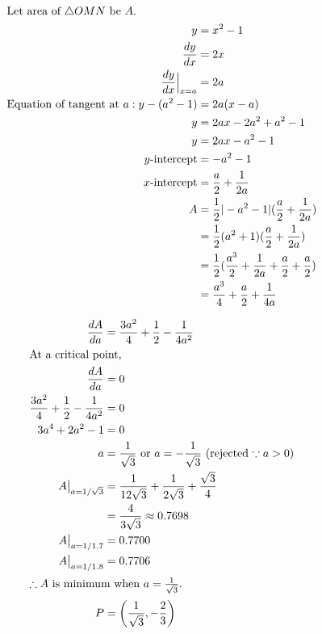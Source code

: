 \documentclass[12pt]{article}
\newenvironment{problem}[2][Problem]{\begin{trivlist}
\item[\hskip \labelsep {\bfseries #1}\hskip \labelsep {\bfseries #2.}]}{\end{trivlist}}
\begin{document}
\begin{problem}{5.i}
\end{problem}
\begin{align*}
\shortintertext{Let area of $\triangle OMN$ be $A$.}
y &= x^2 - 1\\
\frac{dy}{dx} &= 2x\\
\frac{dy}{dx}\Bigl|_{x=a} &= 2a\\
\text{Equation of tangent at $a$} : y-(a^2-1) &= 2a(x-a)\\
y &= 2ax-2a^2 + a^2 - 1\\
y &= 2ax - a^2 - 1\\
\text{$y$-intercept} &= -a^2 -1\\
\text{$x$-intercept} &= \frac{a}{2} + \frac{1}{2a}\\
A &= \frac{1}{2}|-a^2 -1|(\frac{a}{2} + \frac{1}{2a})\\
&= \frac{1}{2}(a^2 + 1)(\frac{a}{2} + \frac{1}{2a})\\
&= \frac{1}{2}(\frac{a^3}{2} + \frac{1}{2a} + \frac{a}{2} + \frac{a}{2})\\
&= \frac{a^3}{4} + \frac{a}{2} + \frac{1}{4a}\\
\end{align*}
\filbreak

\begin{problem}{5.ii}
\end{problem}
\begin{align*}
\frac{dA}{da} &= \frac{3a^2}{4} + \frac{1}{2} - \frac{1}{4a^2}\\
\intertext{At a critical point,}
\frac{dA}{da} &= 0\\
\frac{3a^2}{4} + \frac{1}{2} - \frac{1}{4a^2} &= 0\\ 
3a^4 + 2a^2 - 1 &= 0\\ 
a &= \frac{1}{\sqrt{3}} \text{ or } a = -\frac{1}{\sqrt{3}} \text{ (rejected $\because a > 0$)}\\
A \bigl|_{a=1/\sqrt{3}} &= \frac{1}{12\sqrt{3}} + \frac{1}{2\sqrt{3}} + \frac{\sqrt{3}}{4}\\
&= \frac{4}{3\sqrt{3}} \approx 0.7698\\
A \bigl|_{a=1/1.7} &= 0.7700\\
A \bigl|_{a=1/1.8} &= 0.7706\\
\intertext{$\therefore A$ is minimum when $a = \frac{1}{\sqrt{3}}$.}
P &= \left(\frac{1}{\sqrt{3}}, -\frac{2}{3}\right)
\end{align*}
\filbreak
\end{document}

